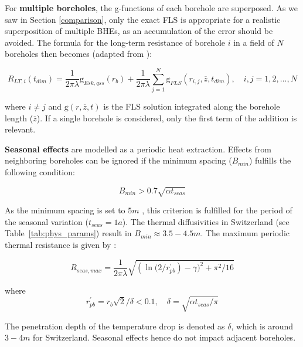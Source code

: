 For \textbf{multiple boreholes}, the g-functions of each borehole are superposed. As we saw in Section \ref{comparison}, only the exact FLS is appropriate for a realistic superposition of multiple BHEs, as an accumulation of the error should be avoided.
The formula for the long-term resistance of borehole $i$ in a field of $N$ boreholes then becomes (adapted from \cite{claesson_analytical_2011}):

\begin{equation}
    R_{LT, i}(t_{dim}) = \frac{1}{2 \pi \lambda} \mathrm{g}_{Esk, qss}(r_b) + \frac{1}{2 \pi \lambda} \sum_{j=1}^N \mathrm{g}_{FLS}(r_{i,j}, \overline{z}, t_{dim}) ,
    \quad i,j = 1, 2, ..., N
\end{equation}

where $i \neq j$ and $\mathrm{g}(r, \overline{z}, t)$ is the FLS solution integrated along the borehole length ($\overline{z}$). If a single borehole is considered, only the first term of the addition is relevant.

\textbf{Seasonal effects} are modelled as a periodic heat extraction. Effects from neighboring boreholes can be ignored if the minimum spacing ($B_{min}$) fulfills the following condition:

\begin{equation}
    B_{min} > 0.7 \sqrt{\alpha t_{seas}}
\end{equation}

As the minimum spacing is set to $5m$ \cite{sia_sondes_2010}, this criterion is fulfilled for the period of the seasonal variation ($t_{seas} = 1a$). The thermal diffusivities in Switzerland (see Table~\ref{tab:phys_params}) result in $B_{min} \approx 3.5-4.5m$. The maximum periodic thermal resistance is given by \citep{claesson_conductive_1988, pahud_geothermal_2002}:

\begin{equation}
    R_{seas, max} = \frac{1}{2 \pi \lambda} \sqrt{\left(\ln(2/r_{pb}^\prime \right) - \gamma)^2 + \pi^2/16}
\end{equation}

where
\begin{equation*}
    r_{pb}^\prime = r_b \sqrt{2}/\delta < 0.1, \quad \delta = \sqrt{ \alpha t_{seas} / \pi}
\end{equation*}
    
The penetration depth of the temperature drop is denoted as $\delta$, which is around $3-4m$ for Switzerland. Seasonal effects hence do not impact adjacent boreholes. 

